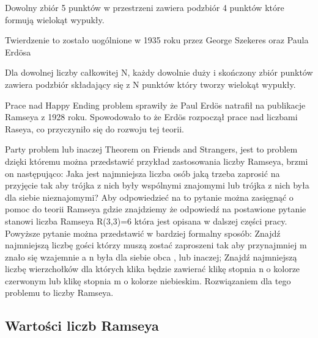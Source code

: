 \begin{theorem}
Dowolny zbiór 5 punktów w przestrzeni zawiera podzbiór 4 punktów które formują wielokąt wypukły.
\end{theorem}

Twierdzenie to zostało uogólnione w 1935 roku przez George Szekeres oraz Paula Erd\"osa

\begin{theorem}
Dla dowolnej liczby całkowitej N, każdy dowolnie duży i skończony zbiór punktów zawiera podzbiór składający się z N punktów który tworzy wielokąt wypukły. \cite{erdoshappy} 
\end{theorem}

Prace nad Happy Ending problem sprawiły że Paul Erd\"os natrafił na publikacje Ramseya z 1928 roku. Spowodowało to że Erd\"os rozpoczął prace nad liczbami Raseya, co przyczyniło się do rozwoju tej teorii.


\hfill  \par
Party problem lub inaczej Theorem on Friends and Strangers, jest to problem dzięki któremu można przedstawić przykład zastosowania liczby Ramseya, brzmi on następująco: Jaka jest najmniejsza liczba osób jaką trzeba zaprosić na przyjęcie tak aby trójka z nich były wspólnymi znajomymi lub trójka z nich była dla siebie nieznajomymi\cite{partyproblem}? Aby odpowiedzieć na to pytanie można zasięgnąć o pomoc do teorii Ramseya gdzie znajdziemy że odpowiedź na postawione pytanie stanowi liczba Ramseya R(3,3)=6 która jest opisana w dalszej części pracy. Powyższe pytanie można przedstawić w bardziej formalny sposób: Znajdź najmniejszą liczbę gości którzy muszą zostać zaproszeni tak aby przynajmniej m znało się wzajemnie a n była dla siebie obca \cite{partyformal}, lub inaczej; Znajdź najmniejszą liczbę wierzchołków dla których klika będzie zawierać klikę stopnia n o kolorze czerwonym lub klikę stopnia m o kolorze niebieskim. Rozwiązaniem dla tego problemu to liczby Ramseya. 


\subsection{Wartości liczb Ramseya}

